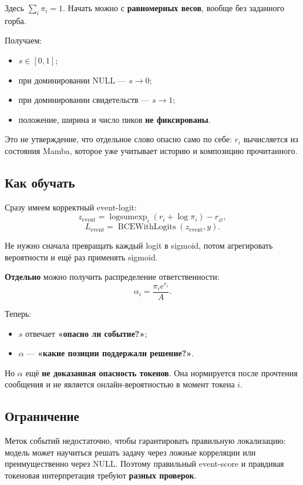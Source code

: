 \documentclass[a4paper,11pt]{article}
\DeclareMathOperator{\logsumexp}{logsumexp}
\begin{document}
Здесь $\sum_i\pi_i=1$. Начать можно с \textbf{равномерных весов}, вообще без
заданного горба.

Получаем:
\begin{itemize}
  \item $s\in[0,1]$;
  \item при доминировании NULL --- $s\to0$;
  \item при доминировании свидетельств --- $s\to1$;
  \item положение, ширина и число пиков \textbf{не фиксированы}.
\end{itemize}

Это не утверждение, что отдельное слово опасно само по себе: $r_i$ вычисляется
из состояния Mamba, которое уже учитывает историю и композицию прочитанного.

\subsection*{Как обучать}

Сразу имеем корректный event-logit:
\[
  z_{\mathrm{event}}
  =\logsumexp_i(r_i+\log\pi_i)-r_{\varnothing},
\]
\[
  L_{\mathrm{event}}
  =\operatorname{BCEWithLogits}(z_{\mathrm{event}},y).
\]

Не нужно сначала превращать каждый logit в sigmoid, потом агрегировать
вероятности и ещё раз применять sigmoid.

\textbf{Отдельно} можно получить распределение ответственности:
\[
  \alpha_i=\frac{\pi_i e^{r_i}}{A}.
\]

Теперь:
\begin{itemize}
  \item $s$ отвечает \textbf{«опасно ли событие?»};
  \item $\alpha$ --- \textbf{«какие позиции поддержали решение?»}.
\end{itemize}

Но $\alpha$ ещё \textbf{не доказанная опасность токенов}. Она нормируется после
прочтения сообщения и не является онлайн-вероятностью в момент токена $i$.

\subsection*{Ограничение}

Меток событий недостаточно, чтобы гарантировать правильную локализацию:
модель может научиться решать задачу через ложные корреляции или преимущественно
через NULL. Поэтому правильный event-score и правдивая токеновая интерпретация
требуют \textbf{разных проверок}.
\end{document}
